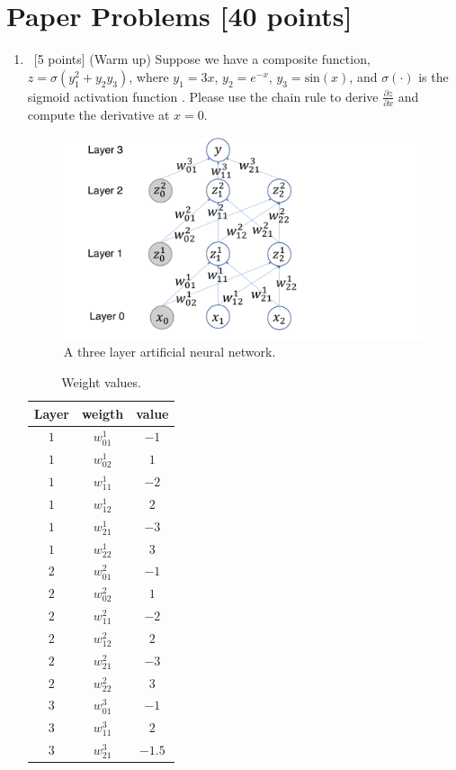 \documentclass[12pt, fullpage,letterpaper]{article}
\begin{document}
\section{Paper Problems [40 points]}
\begin{enumerate}
	\item~[5 points] (Warm up) Suppose we have a composite function, $z = \sigma(y_1^2 +y_2y_3) $, where  $y_1 = 3x$, $y_2 = e^{-x}$, $y_3 = \mathrm{sin}(x)$, and $\sigma(\cdot)$ is the sigmoid activation function . Please use the chain rule to derive $\frac{\partial z}{\partial x}$ and  compute the derivative at $x=0$. 
	\begin{figure}
		\centering
		\includegraphics[width=1.0\textwidth]{./3-layer-NN.pdf}
		\caption{\small A three layer artificial neural network.} 
		\label{fig:3nn}
	\end{figure}
	
	\begin{table}[h]
		\centering
		\begin{tabular}{c|cc}
			Layer & weigth  & value\\ 
			\hline\hline
			$1$ & $w_{01}^1$ & $-1$ \\ \hline
			$1$ & $w_{02}^1$ & $1$ \\ \hline
			$1$ & $w_{11}^1$ & $-2$ \\ \hline
			$1$ & $w_{12}^1$ & $2$ \\ \hline
			$1$ & $w_{21}^1$ & $-3$ \\ \hline
			$1$ & $w_{22}^1$ & $3$ \\ \hline
			$2$ & $w_{01}^2$ & $-1$ \\ \hline
			$2$ & $w_{02}^2$ & $1$ \\ \hline
			$2$ & $w_{11}^2$ & $-2$ \\ \hline
			$2$ & $w_{12}^2$ & $2$ \\ \hline
			$2$ & $w_{21}^2$ & $-3$ \\ \hline
			$2$ & $w_{22}^2$ & $3$ \\ \hline
			$3$ & $w_{01}^3$ & $-1$ \\ \hline
			$3$ & $w_{11}^3$ & $2$ \\ \hline
			$3$ & $w_{21}^3$ & $-1.5$ \\ \hline
		\end{tabular}
		\caption{Weight values.}
		\label{tb:w}
	\end{table}

\end{enumerate}
\end{document}
